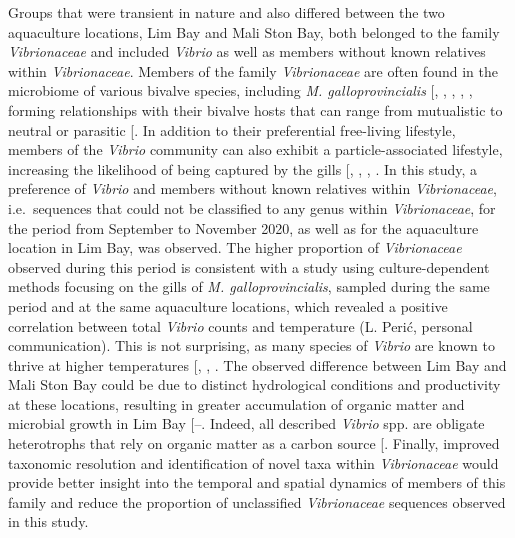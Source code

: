 \documentclass[
  12 pt,
]{article}
\begin{document}
Groups that were transient in nature and also differed between the two aquaculture locations, Lim Bay and Mali Ston Bay, both belonged to the family \emph{Vibrionaceae} and included \emph{Vibrio} as well as members without known relatives within \emph{Vibrionaceae}. Members of the family \emph{Vibrionaceae} are often found in the microbiome of various bivalve species, including \emph{M. galloprovincialis} {[}, , , , \citeproc{ref-Peruzzo2026}{23}{]}, forming relationships with their bivalve hosts that can range from mutualistic to neutral or parasitic {[}\citeproc{ref-Destoumieux-Garzon2020}{104}{]}. In addition to their preferential free-living lifestyle, members of the \emph{Vibrio} community can also exhibit a particle-associated lifestyle, increasing the likelihood of being captured by the gills {[}, , , \citeproc{ref-Liang2019}{132}{]}. In this study, a preference of \emph{Vibrio} and members without known relatives within \emph{Vibrionaceae}, i.e.~sequences that could not be classified to any genus within \emph{Vibrionaceae}, for the period from September to November 2020, as well as for the aquaculture location in Lim Bay, was observed. The higher proportion of \emph{Vibrionaceae} observed during this period is consistent with a study using culture-dependent methods focusing on the gills of \emph{M. galloprovincialis}, sampled during the same period and at the same aquaculture locations, which revealed a positive correlation between total \emph{Vibrio} counts and temperature (L. Perić, personal communication). This is not surprising, as many species of \emph{Vibrio} are known to thrive at higher temperatures {[}, , \citeproc{ref-Liang2019}{132}{]}. The observed difference between Lim Bay and Mali Ston Bay could be due to distinct hydrological conditions and productivity at these locations, resulting in greater accumulation of organic matter and microbial growth in Lim Bay {[}--\citeproc{ref-Skejic2015}{44}{]}. Indeed, all described \emph{Vibrio} spp. are obligate heterotrophs that rely on organic matter as a carbon source {[}\citeproc{ref-Zhang2018a}{133}{]}. Finally, improved taxonomic resolution and identification of novel taxa within \emph{Vibrionaceae} would provide better insight into the temporal and spatial dynamics of members of this family and reduce the proportion of unclassified \emph{Vibrionaceae} sequences observed in this study.
\newpage
\end{document}
